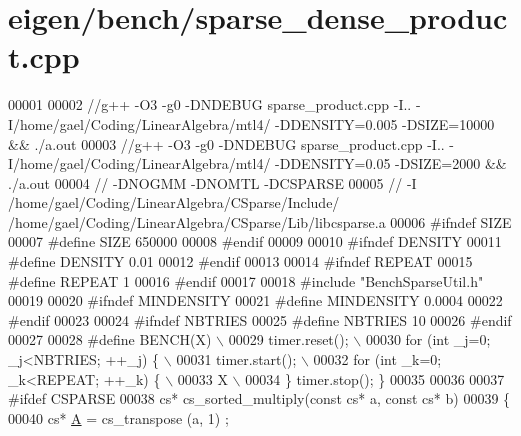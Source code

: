\hypertarget{eigen_2bench_2sparse__dense__product_8cpp_source}{}\section{eigen/bench/sparse\+\_\+dense\+\_\+product.cpp}
\label{eigen_2bench_2sparse__dense__product_8cpp_source}

\begin{DoxyCode}
00001 
00002 \textcolor{comment}{//g++ -O3 -g0 -DNDEBUG  sparse\_product.cpp -I.. -I/home/gael/Coding/LinearAlgebra/mtl4/ -DDENSITY=0.005
       -DSIZE=10000 && ./a.out}
00003 \textcolor{comment}{//g++ -O3 -g0 -DNDEBUG  sparse\_product.cpp -I.. -I/home/gael/Coding/LinearAlgebra/mtl4/ -DDENSITY=0.05
       -DSIZE=2000 && ./a.out}
00004 \textcolor{comment}{// -DNOGMM -DNOMTL -DCSPARSE}
00005 \textcolor{comment}{// -I /home/gael/Coding/LinearAlgebra/CSparse/Include/
       /home/gael/Coding/LinearAlgebra/CSparse/Lib/libcsparse.a}
00006 \textcolor{preprocessor}{#ifndef SIZE}
00007 \textcolor{preprocessor}{#define SIZE 650000}
00008 \textcolor{preprocessor}{#endif}
00009 
00010 \textcolor{preprocessor}{#ifndef DENSITY}
00011 \textcolor{preprocessor}{#define DENSITY 0.01}
00012 \textcolor{preprocessor}{#endif}
00013 
00014 \textcolor{preprocessor}{#ifndef REPEAT}
00015 \textcolor{preprocessor}{#define REPEAT 1}
00016 \textcolor{preprocessor}{#endif}
00017 
00018 \textcolor{preprocessor}{#include "BenchSparseUtil.h"}
00019 
00020 \textcolor{preprocessor}{#ifndef MINDENSITY}
00021 \textcolor{preprocessor}{#define MINDENSITY 0.0004}
00022 \textcolor{preprocessor}{#endif}
00023 
00024 \textcolor{preprocessor}{#ifndef NBTRIES}
00025 \textcolor{preprocessor}{#define NBTRIES 10}
00026 \textcolor{preprocessor}{#endif}
00027 
00028 \textcolor{preprocessor}{#define BENCH(X) \(\backslash\)}
00029 \textcolor{preprocessor}{  timer.reset(); \(\backslash\)}
00030 \textcolor{preprocessor}{  for (int \_j=0; \_j<NBTRIES; ++\_j) \{ \(\backslash\)}
00031 \textcolor{preprocessor}{    timer.start(); \(\backslash\)}
00032 \textcolor{preprocessor}{    for (int \_k=0; \_k<REPEAT; ++\_k) \{ \(\backslash\)}
00033 \textcolor{preprocessor}{        X  \(\backslash\)}
00034 \textcolor{preprocessor}{  \} timer.stop(); \}}
00035 
00036 
00037 \textcolor{preprocessor}{#ifdef CSPARSE}
00038 cs* cs\_sorted\_multiply(\textcolor{keyword}{const} cs* a, \textcolor{keyword}{const} cs* b)
00039 \{
00040   cs* \hyperlink{group___core___module_class_eigen_1_1_matrix}{A} = cs\_transpose (a, 1) ;

\end{DoxyCode}
